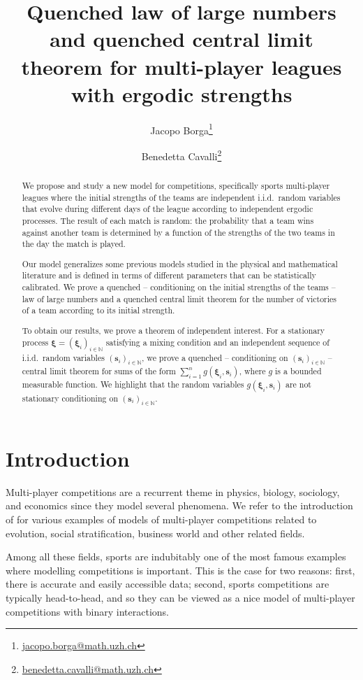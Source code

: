 \documentclass[11pt,a4paper,oneside]{article}
\title{Quenched law of large numbers and quenched central limit theorem for multi-player leagues with ergodic strengths}
\date{  } %
\author[1]{Jacopo Borga\thanks{\href{mailto:jacopo.borga@math.uzh.ch}{jacopo.borga@math.uzh.ch}}}
\author[1]{Benedetta Cavalli\thanks{\href{mailto:benedetta.cavalli@math.uzh.ch}{benedetta.cavalli@math.uzh.ch}}}
\affil[1]{Institut für Mathematik, Universität Zürich}
\theoremstyle{definition}
\theoremstyle{remark}
\def\N{\mathbb{N}}
\begin{document}
\maketitle

\begin{abstract}
We propose and study a new model for competitions, specifically sports multi-player leagues where the initial strengths of the teams are independent i.i.d.\ random variables that evolve during different days of the league according to independent ergodic processes. The result of each match is random: the probability that a team wins against another team is determined by a function of the strengths of the two teams in the day the match is played. 

Our model generalizes some previous models studied in the physical and mathematical  literature and is defined in terms of different parameters that can be statistically calibrated. We prove a quenched -- conditioning on the initial strengths of the teams -- law of large numbers and a quenched central limit theorem for the number of victories of a team according to its initial strength. 

To obtain our results, we prove a theorem of independent interest. For a stationary process $\bm \xi=(\bm \xi_i)_{i\in \N}$ satisfying a mixing condition and an independent sequence of i.i.d.\ random variables $(\bm s_i)_{i\in \N}$, we prove a quenched -- conditioning on $(\bm s_i)_{i\in\N}$ -- central limit theorem for sums of the form $\sum_{i=1}^{n}g\left(\bm \xi_i,\bm s_i\right)$, where $g$ is a bounded measurable function. We highlight that the random variables $g\left(\bm \xi_i,\bm s_i\right)$ are not stationary conditioning on $(\bm s_i)_{i\in\N}$.
\end{abstract}


\section{Introduction}

Multi-player competitions are a recurrent theme in physics, biology, sociology, and economics since they model several phenomena. We refer to the introduction of \cite{ben2007efficiency} for various examples of models of multi-player competitions related to evolution, social stratification, business world and other related fields. 

Among all these fields, sports are indubitably one of the most famous examples where modelling competitions is important. This is the case for two reasons: first, there is accurate and easily accessible data; second, sports competitions are typically head-to-head, and so they can be viewed as a nice model of multi-player competitions with binary interactions.
\end{document}
